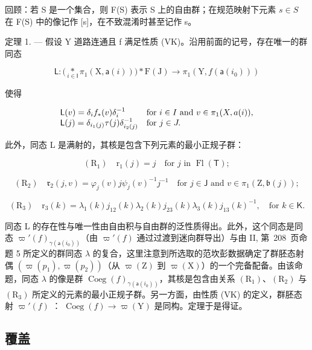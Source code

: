 回顾：若 S 是一个集合，则 F(S) 表示 S 上的自由群；在规范映射下元素 \(s \in S\) 在 F(S) 中的像记作 {[}s{]}，在不致混淆时甚至记作 s。

定理 1. --- 假设 Y 道路连通且 f 满足性质 (VK)。沿用前面的记号，存在唯一的群同态

\[
\mathsf {L} \colon \big (\underset {i \in \mathsf {I}} {\ast} \pi_ {1} (\mathrm{X}, \mathsf {a} (i)) \big) \ast \mathrm{F} (\mathrm{J}) \to \pi_ {1} (\mathrm{Y}, f (\mathsf {a} (i _ {0})))
\]

使得

\[
\begin{array}{l l} \mathsf {L} (v) = \delta_ {i} f _ {*} (v) \delta_ {i} ^ {- 1} & \text {for } i\in I \text { and } v\in\pi_{1} (X,a(i)), \\ \mathsf {L} (j) = \delta_ {i _ {1} (j)} \tau (j) \delta_ {i _ {2} (j)} ^ {- 1} & \text {for } j\in J. \end{array}
\]

此外，同态 L 是满射的，其核是包含下列元素的最小正规子群：

\[
\left(\mathrm{R} _ {1}\right) \quad \mathrm{r} _ {1} (j) = j \quad \text {for } j \text { in } \operatorname{Fl} (\mathsf {T});
\]

\[
\left(\mathrm{R} _ {2}\right) \quad \mathfrak {r} _ {2} (j, v) = \varphi_ {j} (v) j \psi_ {j} (v) ^ {- 1} j ^ {- 1} \quad \text {for } j \in \mathsf {J} \text { and } v \in \pi_ {1} (\mathrm{Z}, \mathfrak {b} (j));
\]

\[
\left(\mathrm{R} _ {3}\right) \quad \mathrm{r} _ {3} (k) = \lambda_ {1} (k) j _ {1 2} (k) \lambda_ {2} (k) j _ {2 3} (k) \lambda_ {3} (k) j _ {1 3} (k) ^ {- 1}, \quad \text {for } k \in \mathsf {K}.
\]

同态 L 的存在性与唯一性由自由积与自由群的泛性质得出。此外，这个同态是同态 \(\varpi'(f)_{\gamma(\mathsf{a}(i_0))}\)（由 \(\varpi'(f)\) 通过过渡到迷向群导出）与由 II, 第~208~页命题 5 所定义的群同态 \(\lambda\) 的复合，这里注意到所选取的范坎彭数据确定了群胚态射偶 \((\varpi(p_1), \varpi(p_2))\)（从 \(\varpi(\mathrm{Z})\) 到 \(\varpi(\mathrm{X})\)）的一个完备配备。由该命题，同态 \(\lambda\) 的像是群 \(\operatorname{Coeg}(f)_{\gamma(\mathsf{a}(i_0))}\)，其核是包含由关系 \((\mathrm{R}_1)\)、\((\mathrm{R}_2)\) 与 \((\mathrm{R}_3)\) 所定义的元素的最小正规子群。另一方面，由性质 (VK) 的定义，群胚态射 \(\varpi'(f)\) ： \(\operatorname{Coeg}(f) \to \varpi(\mathrm{Y})\) 是同构。定理于是得证。

\subsection{覆盖}

